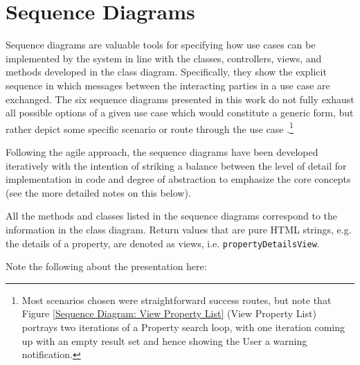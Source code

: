 \section{Sequence Diagrams} \label{sequence_section}

Sequence diagrams are valuable tools for specifying how use cases can be implemented by the system in line with the classes, controllers, views, and methods developed in the class diagram. Specifically, they show the explicit sequence in which messages between the interacting parties in a use case are exchanged. The six sequence diagrams presented in this work do not fully exhaust all possible options of a given use case which would constitute a generic form, but rather depict some specific scenario or route through the use case \cite{George2017}.\footnote{Most scenarios chosen were straightforward success routes, but note that Figure \ref{Sequence Diagram: View Property List} (View Property List) portrays two iterations of a Property search loop, with one iteration coming up with an empty result set and hence showing the User a warning notification.}

Following the agile approach, the sequence diagrams have been developed iteratively with the intention of striking a balance between the level of detail for implementation in code and degree of abstraction to emphasize the core concepts (see the more detailed notes on this below).

All the methods and classes listed in the sequence diagrams correspond to the information in the class diagram. Return values that are pure HTML strings, e.g. the details of a property, are denoted as views, i.e. \texttt{propertyDetailsView}.

Note the following about the presentation here:

